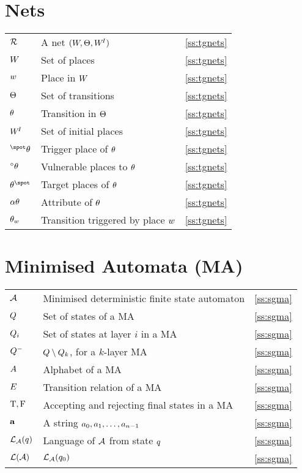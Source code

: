 {\section*{Nets}
\begin{tabular}{l>{\raggedright}p{.5\linewidth}<{}l}
$\RR$ & A net $(W,\Theta,W^{\!I})$ & \ref{ss:tgnets} \\
$W$ & Set of places & \ref{ss:tgnets} \\
${w}$ & Place in $W$ & \ref{ss:tgnets} \\
$\Theta$ & Set of transitions & \ref{ss:tgnets} \\
$\theta$ & Transition in $\Theta$ & \ref{ss:tgnets} \\
$W^{\!I}$ & Set of initial places & \ref{ss:tgnets} \\ 
$\preset{\tr}$ & Trigger place of $\theta$ & \ref{ss:tgnets} \\
${{}^\circ \theta}$ & Vulnerable places to $\theta$ & \ref{ss:tgnets} \\
$\postset{\tr}$ & Target places of $\theta$ & \ref{ss:tgnets} \\
${\alpha\theta}$ & Attribute of $\theta$ & \ref{ss:tgnets} \\
$\theta_{w}$ & Transition triggered by place ${w}$ & \ref{ss:tgnets} \\
\end{tabular}
\vfil

\section*{Minimised Automata (MA)}
\begin{tabular}{l>{\raggedright}p{.5\linewidth}<{}l}
$\MA$ & Minimised deterministic finite state automaton & \ref{ss:sgma} \\
$Q$ & Set of states of a MA & \ref{ss:sgma} \\
$Q_i$ & Set of states at layer $i$ in a MA & \ref{ss:sgma} \\
$Q^-$ & $Q \setminus Q_k$, for a $k$-layer MA & \ref{ss:sgma} \\
$A$ & Alphabet of a MA & \ref{ss:sgma} \\
$E$ & Transition relation of a MA & \ref{ss:sgma} \\
$\mathrm{T},\mathrm{F}$ & Accepting and rejecting final states in a MA & \ref{ss:sgma} \\
${\bf a}$ & A string \hfil\break $a_0,a_1,\ldots,a_{n-1}$ & \ref{ss:sgma} \\
$\Lang_\MA(\MAstate)$ & Language of $\MA$ from state $q$ & \ref{ss:sgma} \\
$\Lang(\MA)$ & $\Lang_\MA(\MAstate_0)$ & \ref{ss:sgma} \\
\end{tabular}
\vfil
}
\onecolumn















